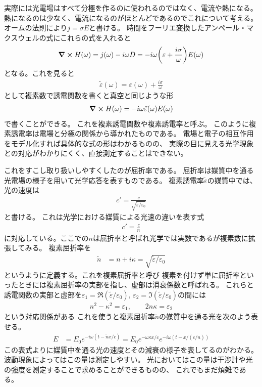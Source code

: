\documentclass[11pt,dvipdfmx,a4paper]{jsarticle}
\begin{document}
実際には光電場はすべて分極を作るのに使われるのではなく、電流や熱になる。
熱になるのは少なく、電流になるのがほとんどであるのでこれについて考える。
オームの法則により\(j=\sigma E\)と書ける。
時間をフーリエ変換したアンペール・マクスウェルの式にこれらの式を入れると
\begin{align}
    \curl H(\omega) = j(\omega) - i\omega D = -i\omega \qty(\varepsilon+\frac{i\sigma}{\omega}) E(\omega)
\end{align}
となる。これを見ると
\begin{align}
    \tilde{\varepsilon}(\omega) = \varepsilon(\omega) + \frac{i\sigma}{\omega}
\end{align}
として複素数で誘電関数を書くと真空と同じような形
\begin{align}
    \curl H(\omega) = -i\omega \tilde{\varepsilon}(\omega) E(\omega)
\end{align}
で書くことができる。
これを複素誘電関数や複素誘電率と呼ぶ。
このように複素誘電率は電場と分極の関係から導かれたものである。
電場と電子の相互作用をモデル化すれば具体的な式の形はわかるものの、
実際の目に見える光学現象との対応がわかりにくく、直接測定することはできない。

これをすこし取り扱いしやすくしたのが屈折率である。
屈折率は媒質中を通る光電場の様子を用いて光学応答を表すものである。
複素誘電率\(\tilde{\varepsilon}\)の媒質中では、光の速度は
\begin{align}
    c' = \frac{c}{\sqrt{\tilde{\varepsilon}/\varepsilon_0}}
\end{align}
と書ける。
これは光学における媒質による光速の違いを表す式
\begin{align}
    c' = \frac{c}{n}
\end{align}
に対応している。ここでの\(n\)は屈折率と呼ばれ光学では実数であるが複素数に拡張してみる。
複素屈折率を
\begin{align}
    \tilde{n} &= n + i\kappa = \sqrt{\tilde{\varepsilon}/\varepsilon_0}
\end{align}
というように定義する。これを複素屈折率と呼び
複素を付けず単に屈折率といったときには複素屈折率の実部を指し、虚部は消衰係数と呼ばれる。
これらと誘電関数の実部と虚部を\(\varepsilon_1=\Re(\tilde{\varepsilon}/\varepsilon_0),\,\varepsilon_2=\Im(\tilde{\varepsilon}/\varepsilon_0)\)の間には
\begin{align}
    n^2-\kappa^2 = \varepsilon_1,\qquad 2n\kappa = \varepsilon_2
\end{align}
という対応関係がある
これを使うと複素屈折率\(\tilde{n}\)の媒質中を通る光を次のよう表せる。
\begin{align}
    E &= E_0 e^{-i\omega (t - \tilde{n}x/c)} = E_0 e^{-\omega \kappa x / c}e^{-i\omega (t - x/(c/n))}
\end{align}
この表式よりに媒質中を通る光の速度とその減衰の様子を表してるのがわかる。
波動現象によってはこの量は測定しやすい。
光においてはこの量は干渉計や光の強度を測定することで求めることができるものの、
これでもまだ煩雑である。
\end{document}
